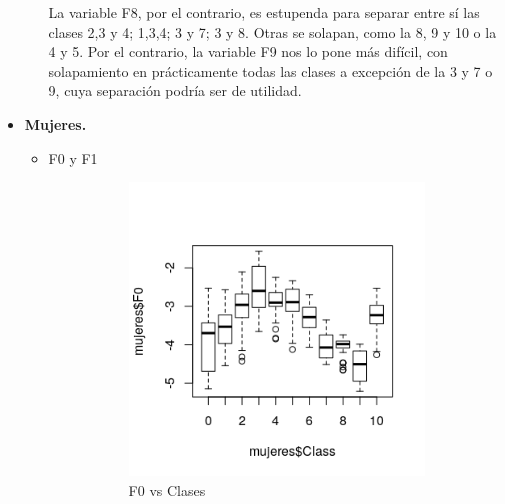 \begin{itemize}
\begin{itemize}
	La variable F8, por el contrario, es estupenda para separar entre sí las clases 2,3 y 4; 1,3,4; 3 y 7; 3 y 8. Otras se solapan, como la 8, 9 y 10  o la 4 y 5. Por el contrario, la variable F9 nos lo pone más difícil, con solapamiento en prácticamente todas las clases a excepción de la 3 y 7 o 9, cuya separación podría ser de utilidad.
	\end{itemize}
	
	\item \textbf{Mujeres.}
	
	\begin{itemize}
		\item F0 y F1
		
		\begin{figure}[H]
			\centering
			\begin{subfigure}{.5\textwidth}
				\centering
				\includegraphics[width=.9\linewidth]{bpmF0.png}
				\caption{F0 vs Clases}
				\label{fig:bpmF0}
			\end{subfigure}%
			\begin{subfigure}{.5\textwidth}
				\centering

\end{subfigure}
\end{figure}
\end{itemize}
\end{itemize}
